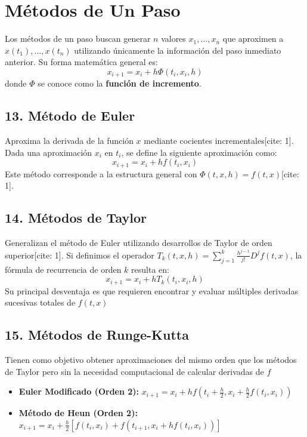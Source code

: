 \documentclass[12pt]{article}
\begin{document}
\section*{Métodos de Un Paso}

Los métodos de un paso buscan generar $n$ valores $x_1, \dots, x_n$ que aproximen a $x(t_1), \dots, x(t_n)$ utilizando únicamente la información del paso inmediato anterior. 
Su forma matemática general es:
\begin{equation}
    x_{i+1} = x_i + h\Phi(t_i, x_i, h)
\end{equation}
donde $\Phi$ se conoce como la \textbf{función de incremento}.

\subsection*{13. Método de Euler}
Aproxima la derivada de la función $x$ mediante cocientes incrementales[cite: 1]. Dada una aproximación $x_i$ en $t_i$, se define la siguiente aproximación como:
\begin{equation}
    x_{i+1} = x_i + h f(t_i, x_i)
\end{equation}
Este método corresponde a la estructura general con $\Phi(t, x, h) = f(t, x)$[cite: 1].

\subsection*{14. Métodos de Taylor}
Generalizan el método de Euler utilizando desarrollos de Taylor de orden superior[cite: 1]. Si definimos el operador $T_k(t, x, h) = \sum_{j=1}^k \frac{h^{j-1}}{j!} D^j f(t, x)$, la fórmula de recurrencia de orden $k$ resulta en:
\begin{equation}
    x_{i+1} = x_i + h T_k(t_i, x_i, h)
\end{equation}
Su principal desventaja es que requieren encontrar y evaluar múltiples derivadas sucesivas totales de $f(t, x)$

\subsection*{15. Métodos de Runge-Kutta}
Tienen como objetivo obtener aproximaciones del mismo orden que los métodos de Taylor pero sin la necesidad computacional de calcular derivadas de $f$
\begin{itemize}
    \item \textbf{Euler Modificado (Orden 2):} $x_{i+1} = x_i + h f\left(t_i + \frac{h}{2}, x_i + \frac{h}{2}f(t_i, x_i)\right)$
    \item \textbf{Método de Heun (Orden 2):} $x_{i+1} = x_i + \frac{h}{2} [f(t_i, x_i) + f(t_{i+1}, x_i + h f(t_i, x_i))]$
\end{itemize}
\end{document}
